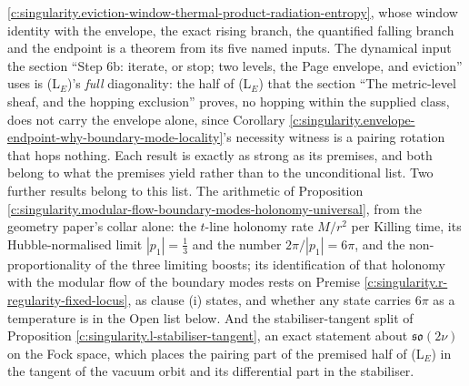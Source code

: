 \documentclass[11pt]{article}
\theoremstyle{definition}
\theoremstyle{plain}
\begin{document}
\ref{c:singularity.eviction-window-thermal-product-radiation-entropy}, whose window identity with the envelope, the exact rising branch, the quantified falling branch and the endpoint is a theorem from its five named inputs. The dynamical input the section ``Step 6b: iterate, or stop; two levels, the Page envelope, and eviction'' uses is (L$_E$)'s \emph{full} diagonality: the half of (L$_E$) that the section ``The metric-level sheaf, and the hopping exclusion'' proves, no hopping within the supplied class, does not carry the envelope alone, since Corollary \ref{c:singularity.envelope-endpoint-why-boundary-mode-locality}'s necessity witness is a pairing rotation that hops nothing. Each result is exactly as strong as its premises, and both belong to what the premises yield rather than to the unconditional list. Two further results belong to this list. The arithmetic of Proposition \ref{c:singularity.modular-flow-boundary-modes-holonomy-universal}, from the geometry paper's collar alone: the $t$-line holonomy rate $M/r^2$ per Killing time, its Hubble-normalised limit $|p_1| = \tfrac13$ and the number $2\pi/|p_1| = 6\pi$, and the non-proportionality of the three limiting boosts; its identification of that holonomy with the modular flow of the boundary modes rests on Premise \ref{c:singularity.r-regularity-fixed-locus}, as clause (i) states, and whether any state carries $6\pi$ as a temperature is in the Open list below. And the stabiliser-tangent split of Proposition \ref{c:singularity.l-stabiliser-tangent}, an exact statement about $\mathfrak{so}(2\nu)$ on the Fock space, which places the pairing part of the premised half of (L$_E$) in the tangent of the vacuum orbit and its differential part in the stabiliser.
\end{document}
